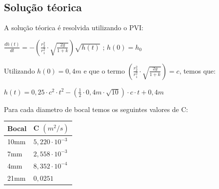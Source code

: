 \documentclass[12pt]{article}
\begin{document}
\subsection{Solução téorica}
\tab A solução téorica é resolvida utilizando o PVI:
\begin{center}
    $ \frac{dh(t)}{dt} =  -(\frac{r_2^2}{r_1^2}\cdot\sqrt{\frac{2g}{1 + k} } ) \sqrt{h(t)}$ ; $ h(0) = h_0 $
\end{center}
Utilizando $ h(0) = 0,4m$ e que o termo $(\frac{r_2^2}{r_1^2}\cdot\sqrt{\frac{2g}{1 + k} } ) = c$, temos que:
\begin{center}
    $ h(t) =  0,25 \cdot c^2  \cdot t^2 - (\frac{1}{2} \cdot 0,4m \cdot \sqrt{10})\cdot c   \cdot t + 0,4m$
\end{center}
Para cada diametro de bocal temos os seguintes valores de C:
\begin{table}[H]
    \begin{tabular}{|l|l|}
        \hline
        Bocal & C          $(m^2/s)$ \\ \hline
        10mm  & $5,220\cdot10^{-3}$  \\ \hline
        7mm   & $2,558\cdot10^{-3}$  \\ \hline
        4mm   & $8,352\cdot10^{-4}$  \\ \hline
        21mm  & $0,0251$             \\ \hline
    \end{tabular}
\end{table}
\end{document}
